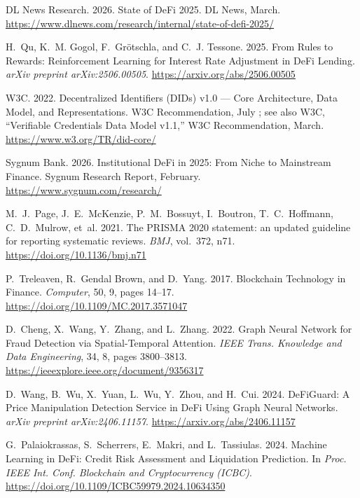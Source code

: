 \documentclass[12pt, a4paper]{report}
\begin{document}
{\begin{enumerate}[label={[\arabic*]}]
\item DL News Research. 2026. State of DeFi 2025. DL News, March. \url{https://www.dlnews.com/research/internal/state-of-defi-2025/}

\item H.~Qu, K.~M. Gogol, F.~Gr\"{o}tschla, and C.~J. Tessone. 2025. From Rules to Rewards: Reinforcement Learning for Interest Rate Adjustment in DeFi Lending. \emph{arXiv preprint arXiv:2506.00505}. \url{https://arxiv.org/abs/2506.00505}

\item W3C. 2022. Decentralized Identifiers (DIDs) v1.0 --- Core Architecture, Data Model, and Representations. W3C Recommendation, July ; see also W3C, ``Verifiable Credentials Data Model v1.1,'' W3C Recommendation, March. \url{https://www.w3.org/TR/did-core/}

\item Sygnum Bank. 2026. Institutional DeFi in 2025: From Niche to Mainstream Finance. Sygnum Research Report, February. \url{https://www.sygnum.com/research/}

\item M.~J.~Page, J.~E.~McKenzie, P.~M.~Bossuyt, I.~Boutron, T.~C.~Hoffmann, C.~D.~Mulrow, et~al. 2021. The PRISMA 2020 statement: an updated guideline for reporting systematic reviews. \emph{BMJ}, vol.~372, n71. \url{https://doi.org/10.1136/bmj.n71}

\item P.~Treleaven, R.~Gendal Brown, and D.~Yang. 2017. Blockchain Technology in Finance. \emph{Computer}, 50, 9, pages 14--17. \url{https://doi.org/10.1109/MC.2017.3571047}

\item D.~Cheng, X.~Wang, Y.~Zhang, and L.~Zhang. 2022. Graph Neural Network for Fraud Detection via Spatial-Temporal Attention. \emph{IEEE Trans. Knowledge and Data Engineering}, 34, 8, pages 3800--3813. \url{https://ieeexplore.ieee.org/document/9356317}

\item D.~Wang, B.~Wu, X.~Yuan, L.~Wu, Y.~Zhou, and H.~Cui. 2024. DeFiGuard: A Price Manipulation Detection Service in DeFi Using Graph Neural Networks. \emph{arXiv preprint arXiv:2406.11157}. \url{https://arxiv.org/abs/2406.11157}

\item G.~Palaiokrassas, S.~Scherrers, E.~Makri, and L.~Tassiulas. 2024. Machine Learning in DeFi: Credit Risk Assessment and Liquidation Prediction. In \emph{Proc. IEEE Int. Conf. Blockchain and Cryptocurrency (ICBC)}. \url{https://doi.org/10.1109/ICBC59979.2024.10634350}


\end{enumerate}}
\end{document}
